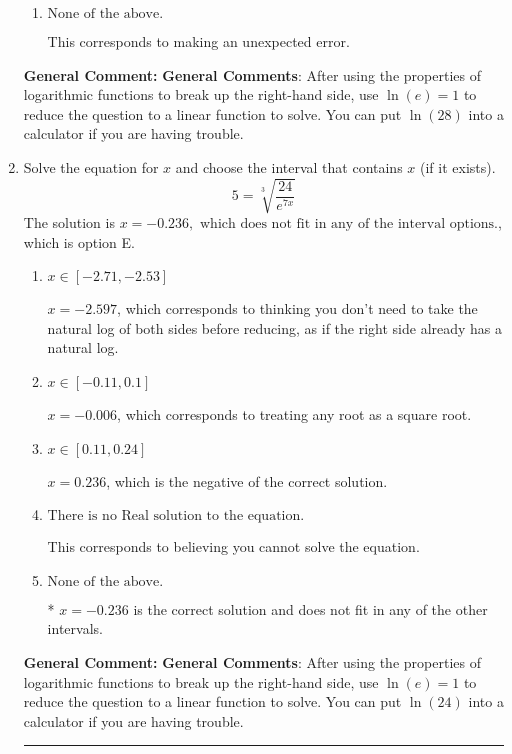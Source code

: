 \documentclass{extbook}[14pt]
\newcommand{\litem}[1]{\item #1

\rule{\textwidth}{0.4pt}}
\begin{document}
\begin{enumerate}
{\begin{enumerate}[label=\Alph*.]
This corresponds to believing you cannot solve the equation.
\item \( \text{None of the above.} \)

This corresponds to making an unexpected error.
\end{enumerate}

\textbf{General Comment:} \textbf{General Comments}: After using the properties of logarithmic functions to break up the right-hand side, use $\ln(e) = 1$ to reduce the question to a linear function to solve. You can put $\ln(28)$ into a calculator if you are having trouble.
}
\litem{
 Solve the equation for $x$ and choose the interval that contains $x$ (if it exists).
\[  5 = \sqrt[3]{\frac{24}{e^{7x}}} \]The solution is \( x = -0.236, \text{ which does not fit in any of the interval options.} \), which is option E.\begin{enumerate}[label=\Alph*.]
\item \( x \in [-2.71, -2.53] \)

$x = -2.597$, which corresponds to thinking you don't need to take the natural log of both sides before reducing, as if the right side already has a natural log.
\item \( x \in [-0.11, 0.1] \)

$x = -0.006$, which corresponds to treating any root as a square root.
\item \( x \in [0.11, 0.24] \)

$x = 0.236$, which is the negative of the correct solution.
\item \( \text{There is no Real solution to the equation.} \)

This corresponds to believing you cannot solve the equation.
\item \( \text{None of the above.} \)

* $x = -0.236$ is the correct solution and does not fit in any of the other intervals.
\end{enumerate}

\textbf{General Comment:} \textbf{General Comments}: After using the properties of logarithmic functions to break up the right-hand side, use $\ln(e) = 1$ to reduce the question to a linear function to solve. You can put $\ln(24)$ into a calculator if you are having trouble.
}
\end{enumerate}
\end{document}
